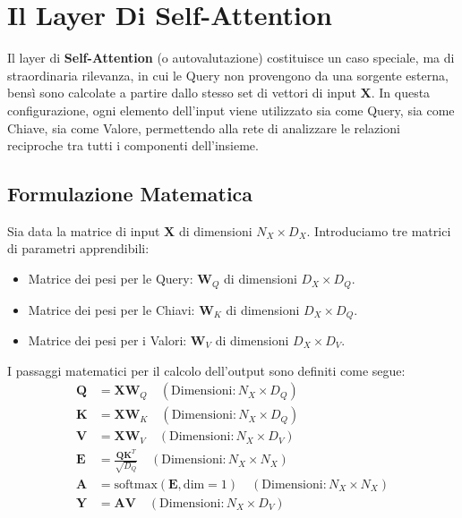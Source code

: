 ﻿\documentclass[11pt, a4paper]{article}
\begin{document}
\newpage

\section{Il Layer Di Self-Attention}

Il layer di \textbf{Self-Attention} (o autovalutazione) costituisce un caso speciale, ma di straordinaria rilevanza, in cui le Query non provengono da una sorgente esterna, bensì sono calcolate a partire dallo stesso set di vettori di input $\bm{X}$. In questa configurazione, ogni elemento dell'input viene utilizzato sia come Query, sia come Chiave, sia come Valore, permettendo alla rete di analizzare le relazioni reciproche tra tutti i componenti dell'insieme.


\subsection{Formulazione Matematica}

Sia data la matrice di input $\bm{X}$ di dimensioni $N_X \times D_X$. Introduciamo tre matrici di parametri apprendibili:
\begin{itemize}
    \item Matrice dei pesi per le Query: $\bm{W}_Q$ di dimensioni $D_X \times D_Q$.
    \item Matrice dei pesi per le Chiavi: $\bm{W}_K$ di dimensioni $D_X \times D_Q$.
    \item Matrice dei pesi per i Valori: $\bm{W}_V$ di dimensioni $D_X \times D_V$.
\end{itemize}

I passaggi matematici per il calcolo dell'output sono definiti come segue:
\begin{align*}
\bm{Q} &= \bm{X} \bm{W}_Q \quad (\text{Dimensioni}: N_X \times D_Q) \\
\bm{K} &= \bm{X} \bm{W}_K \quad (\text{Dimensioni}: N_X \times D_Q) \\
\bm{V} &= \bm{X} \bm{W}_V \quad (\text{Dimensioni}: N_X \times D_V) \\
\bm{E} &= \frac{\bm{Q}\bm{K}^T}{\sqrt{D_Q}} \quad (\text{Dimensioni}: N_X \times N_X) \\
\bm{A} &= \text{softmax}(\bm{E}, \text{dim}=1) \quad (\text{Dimensioni}: N_X \times N_X) \\
\bm{Y} &= \bm{A}\bm{V} \quad (\text{Dimensioni}: N_X \times D_V)
\end{align*}
\end{document}
